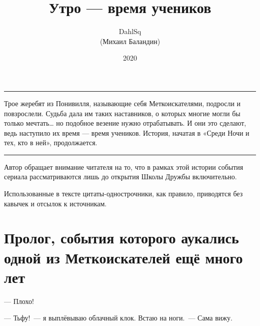 \documentclass[fontsize=11pt,a5paper,titlepage=firstcover]{scrbook}
\begin{document}
\begin{titlepage}
	\title{Утро — время учеников}
	\author{DahlSq\\(Михаил Баландин)}
	\date{2020}
	\publishers{\texttt{\url{http://fanfiction.balandin.online}}\\
		\texttt{\url{https://ficbook.net/authors/2707630}}}
\end{titlepage}

\frontmatter

\maketitle

\clearpage
\thispagestyle{empty}

\mbox{}

\vspace{2cm}

\hrule

\bigskip

\noindent Трое жеребят из Понивилля, называющие себя Меткоискателями, подросли и повзрослели. Судьба дала им таких наставников, о которых многие могли бы только мечтать… но подобное везение нужно отрабатывать. И они это сделают, ведь наступило их время — время учеников. История, начатая в «Среди Ночи и тех, кто в ней», продолжается.

\bigskip

\hrule

\vspace{2cm}

\noindent Автор обращает внимание читателя на то, что в рамках этой истории события сериала рассматриваются лишь до открытия Школы Дружбы включительно.

\bigskip

\noindent Использованные в тексте цитаты-однострочники, как правило, приводятся без кавычек и отсылок к источникам.

\clearpage

\tableofcontents


\mainmatter

\chapter*{Пролог, события которого аукались одной из Меткоискателей ещё много лет}


--- Плохо!

--- Тьфу!~--- я выплёвываю облачный клок. Встаю на ноги.~--- Сама вижу.
\end{document}
